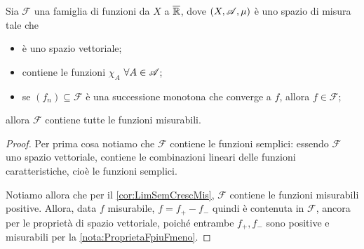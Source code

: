 \begin{theorem}\label{thm:ChiusuraMonotona}
	Sia $\mathcal F$ una famiglia di funzioni da $X$ a $\overline{\mathbb R}$, dove $(X,\mathscr A,\mu)$ è uno spazio di misura tale che
	\begin{itemize}
	 \item è uno spazio vettoriale;
	 \item contiene le funzioni $\chi_A$ $\forall A\in \mathscr A$;
	 \item se $(f_n)\subseteq \mathcal F$ è una successione monotona che converge a $f$, allora $f\in \mathcal F$;
	\end{itemize}
	allora $\mathcal F$ contiene tutte le funzioni misurabili.
\end{theorem}
\begin{proof}
	Per prima cosa notiamo che $\mathcal F$ contiene le funzioni semplici: essendo $\mathcal F$ uno spazio vettoriale, contiene le combinazioni
	lineari delle funzioni caratteristiche, cioè le funzioni semplici.
	
	Notiamo allora che per il \cref{cor:LimSemCrescMis}, $\mathcal F$ contiene le funzioni misurabili positive. Allora, data $f$ misurabile,
	$f = f_+-f_-$ quindi è contenuta in $\mathcal F$, ancora per le proprietà di spazio vettoriale, poiché entrambe $f_+,f_-$ sono
	positive e misurabili per la \cref{nota:ProprietaFpiuFmeno}.
\end{proof}
